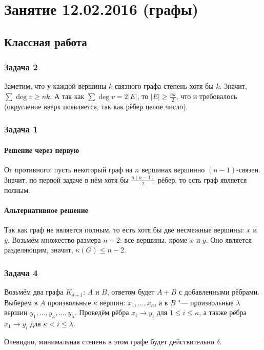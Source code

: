 \chapter{Занятие 12.02.2016 (графы)}
\section{Классная работа}
\subsection{Задача 2}
	Заметим, что у каждой вершины $k$-связного графа степень хотя бы $k$.
	Значит, $\sum \deg v \ge nk$.
	А так как $\sum\deg v = 2|E|$, то $|E| \ge \frac{nk}{2}$, что и требовалось
	(округление вверх появляется, так как рёбер целое число).

\subsection{Задача 1}
	\subsubsection{Решение через первую}
		От противного: пусть некоторый граф на $n$ вершинах вершинно $(n-1)$-связен.
		Значит, по первой задаче в нём хотя бы $\frac{n(n-1)}{2}$ рёбер, то есть
		граф является полным.

	\subsubsection{Альтернативное решение}
		Так как граф не является полным, то есть хотя бы две несмежные вершины: $x$ и $y$.
		Возьмём множество размера $n-2$: все вершины, кроме $x$ и $y$.
		Оно является разделяющим, значит, $\kappa(G) \le n - 2$.

\subsection{Задача 4}
	Возьмём два графа $K_{\delta+1}$: $A$ и $B$, ответом будет $A+B$ с добавленными рёбрами.
	Выберем в $A$ произвольные $\kappa$ вершин: $x_1, \dots, x_\kappa$,
	а в $B$ "--- произвольные $\lambda$ вершин $y_1, \dots, y_\kappa, \dots, y_\lambda$.
	Проведём рёбра $x_i \to y_i$ для $1 \le i \le \kappa$, а также
	рёбра $x_1 \to y_i$ для $\kappa < i \le \lambda$.

	Очевидно, минимальная степень в этом графе будет действительно $\delta$.


